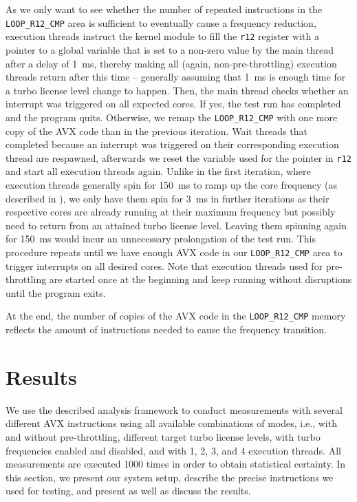 As we only want to see whether the number of repeated instructions in the \texttt{LOOP\_R12\_CMP} area is sufficient to eventually cause a frequency reduction, execution threads instruct the kernel module to fill the \texttt{r12} register with a pointer to a global variable that is set to a non-zero value by the main thread after a delay of \SI{1}{\milli\second}, thereby making all (again, non-pre-throttling) execution threads return after this time -- generally assuming that \SI{1}{\milli\second} is enough time for a turbo license level change to happen. Then, the main thread checks whether an interrupt was triggered on all expected cores. If yes, the test run has completed and the program quits. Otherwise, we remap the \texttt{LOOP\_R12\_CMP} with one more copy of the \gls{AVX} code than in the previous iteration. Wait threads that completed because an interrupt was triggered on their corresponding execution thread are respawned, afterwards we reset the variable used for the pointer in \texttt{r12} and start all execution threads again. Unlike in the first iteration, where execution threads generally spin for \SI{150}{\milli\second} to ramp up the core frequency (as described in ), we only have them spin for \SI{3}{\milli\second} in further iterations as their respective cores are already running at their maximum frequency but possibly need to return from an attained turbo license level. Leaving them spinning again for \SI{150}{\milli\second} would incur an unnecessary prolongation of the test run. This procedure repeats until we have enough \gls{AVX} code in our \texttt{LOOP\_R12\_CMP} area to trigger interrupts on all desired cores. Note that execution threads used for pre-throttling are started once at the beginning and keep running without disruptions until the program exits.

At the end, the number of copies of the \gls{AVX} code in the \texttt{LOOP\_R12\_CMP} memory reflects the amount of instructions needed to cause the frequency transition.

\section{Results}
\label{sec:analysis:results}

We use the described analysis framework to conduct measurements with several different \gls{AVX} instructions using all available combinations of modes, i.e., with and without pre-throttling, different target turbo license levels, with turbo frequencies enabled and disabled, and with 1, 2, 3, and 4 execution threads. All measurements are executed 1000 times in order to obtain statistical certainty. In this section, we present our system setup, describe the precise instructions we used for testing, and present as well as discuss the results.

